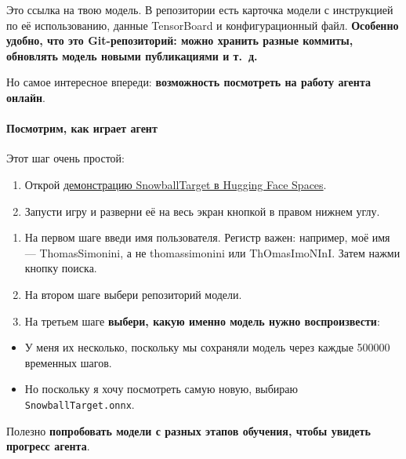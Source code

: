 \documentclass[11pt,a4paper]{article}
\begin{document}
Это ссылка на твою модель. В репозитории есть карточка модели с инструкцией по её использованию, данные TensorBoard и конфигурационный файл. \textbf{Особенно удобно, что это Git-репозиторий: можно хранить разные коммиты, обновлять модель новыми публикациями и т.~д.}

Но самое интересное впереди: \textbf{возможность посмотреть на работу агента онлайн}.

\paragraph{Посмотрим, как играет агент}\label{watch-your-agent-playing}

Этот шаг очень простой:

\begin{enumerate}
\def\labelenumi{\arabic{enumi}.}
\item
  Открой \href{https://huggingface.co/spaces/ThomasSimonini/ML-Agents-SnowballTarget}{демонстрацию SnowballTarget в Hugging Face Spaces}.
\item
  Запусти игру и разверни её на весь экран кнопкой в правом нижнем углу.
\end{enumerate}


\begin{enumerate}
\def\labelenumi{\arabic{enumi}.}
\item
  На первом шаге введи имя пользователя. Регистр важен: например, моё имя --- ThomasSimonini, а не thomassimonini или ThOmasImoNInI. Затем нажми кнопку поиска.
\item
  На втором шаге выбери репозиторий модели.
\item
  На третьем шаге \textbf{выбери, какую именно модель нужно воспроизвести}:
\end{enumerate}

\begin{itemize}
\tightlist
\item
  У меня их несколько, поскольку мы сохраняли модель через каждые 500000 временных шагов.
\item
  Но поскольку я хочу посмотреть самую новую, выбираю \texttt{SnowballTarget.onnx}.
\end{itemize}

Полезно \textbf{попробовать модели с разных этапов обучения, чтобы увидеть прогресс агента}.
\end{document}
